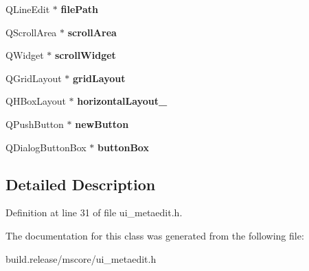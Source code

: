 \begin{DoxyCompactItemize}
Q\+Line\+Edit $\ast$ {\bfseries file\+Path}
\item 
\mbox{\label{class_ui___meta_edit_dialog_ad4bd8bee7ef3153a166b95bf965f3867}} 
Q\+Scroll\+Area $\ast$ {\bfseries scroll\+Area}
\item 
\mbox{\label{class_ui___meta_edit_dialog_a0c38434724cb5b5d4b9d73431565c9d6}} 
Q\+Widget $\ast$ {\bfseries scroll\+Widget}
\item 
\mbox{\label{class_ui___meta_edit_dialog_af3d07702e5f2ef5870873d4a4db02381}} 
Q\+Grid\+Layout $\ast$ {\bfseries grid\+Layout}
\item 
\mbox{\label{class_ui___meta_edit_dialog_ac8fb7a907f1d878a72c6922ce2ca36cc}} 
Q\+H\+Box\+Layout $\ast$ {\bfseries horizontal\+Layout\+\_}
\item 
\mbox{\label{class_ui___meta_edit_dialog_a3843d76d0070f343b6d23d59c8abbb33}} 
Q\+Push\+Button $\ast$ {\bfseries new\+Button}
\item 
\mbox{\label{class_ui___meta_edit_dialog_a9a65ce46e695b2fd61509f0de8ad97db}} 
Q\+Dialog\+Button\+Box $\ast$ {\bfseries button\+Box}
\end{DoxyCompactItemize}


\subsection{Detailed Description}


Definition at line 31 of file ui\+\_\+metaedit.\+h.



The documentation for this class was generated from the following file\+:\begin{DoxyCompactItemize}
\item 
build.\+release/mscore/ui\+\_\+metaedit.\+h\end{DoxyCompactItemize}
